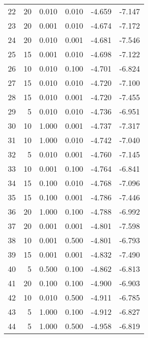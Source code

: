 \begin{tabular}{rrrrrr}
    22 &        20 &  0.010 & 0.010 &                 -4.659 &      -7.147 \\
    23 &        20 &  0.001 & 0.010 &                 -4.674 &      -7.172 \\
    24 &        20 &  0.010 & 0.001 &                 -4.681 &      -7.546 \\
    25 &        15 &  0.001 & 0.010 &                 -4.698 &      -7.122 \\
    26 &        10 &  0.010 & 0.100 &                 -4.701 &      -6.824 \\
    27 &        15 &  0.010 & 0.010 &                 -4.720 &      -7.100 \\
    28 &        15 &  0.010 & 0.001 &                 -4.720 &      -7.455 \\
    29 &         5 &  0.010 & 0.010 &                 -4.736 &      -6.951 \\
    30 &        10 &  1.000 & 0.001 &                 -4.737 &      -7.317 \\
    31 &        10 &  1.000 & 0.010 &                 -4.742 &      -7.040 \\
    32 &         5 &  0.010 & 0.001 &                 -4.760 &      -7.145 \\
    33 &        10 &  0.001 & 0.100 &                 -4.764 &      -6.841 \\
    34 &        15 &  0.100 & 0.010 &                 -4.768 &      -7.096 \\
    35 &        15 &  0.100 & 0.001 &                 -4.786 &      -7.446 \\
    36 &        20 &  1.000 & 0.100 &                 -4.788 &      -6.992 \\
    37 &        20 &  0.001 & 0.001 &                 -4.801 &      -7.598 \\
    38 &        10 &  0.001 & 0.500 &                 -4.801 &      -6.793 \\
    39 &        15 &  0.001 & 0.001 &                 -4.832 &      -7.490 \\
    40 &         5 &  0.500 & 0.100 &                 -4.862 &      -6.813 \\
    41 &        20 &  0.100 & 0.100 &                 -4.900 &      -6.903 \\
    42 &        10 &  0.010 & 0.500 &                 -4.911 &      -6.785 \\
    43 &         5 &  1.000 & 0.100 &                 -4.912 &      -6.827 \\
    44 &         5 &  1.000 & 0.500 &                 -4.958 &      -6.819 \\

\end{tabular}
